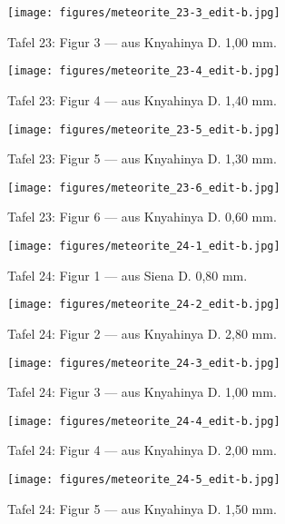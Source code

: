 \documentclass[a4paper, 11pt, oneside]{article}
\begin{document}
\clearpage
\begin{figure}[t]
\texttt{[image: figures/meteorite\_23-3\_edit-b.jpg]}
\caption{Tafel 23: Figur 3 --- aus Knyahinya D. 1,00 mm.}
\centering
\end{figure}
\clearpage
\begin{figure}[t]
\texttt{[image: figures/meteorite\_23-4\_edit-b.jpg]}
\caption{Tafel 23: Figur 4 --- aus Knyahinya D. 1,40 mm.}
\centering
\end{figure}
\clearpage
\begin{figure}[t]
\texttt{[image: figures/meteorite\_23-5\_edit-b.jpg]}
\caption{Tafel 23: Figur 5 --- aus Knyahinya D. 1,30 mm.}
\centering
\end{figure}
\clearpage
\begin{figure}[t]
\texttt{[image: figures/meteorite\_23-6\_edit-b.jpg]}
\caption{Tafel 23: Figur 6 --- aus Knyahinya D. 0,60 mm.}
\centering
\end{figure}
\clearpage
{}
\begin{figure}[t]
\texttt{[image: figures/meteorite\_24-1\_edit-b.jpg]}
\caption{Tafel 24: Figur 1 --- aus Siena D. 0,80 mm.}
\centering
\end{figure}
\clearpage
\begin{figure}[t]
\texttt{[image: figures/meteorite\_24-2\_edit-b.jpg]}
\caption{Tafel 24: Figur 2 --- aus Knyahinya D. 2,80 mm.}
\centering
\end{figure}
\clearpage
\begin{figure}[t]
\texttt{[image: figures/meteorite\_24-3\_edit-b.jpg]}
\caption{Tafel 24: Figur 3 --- aus Knyahinya D. 1,00 mm.}
\centering
\end{figure}
\clearpage
\begin{figure}[t]
\texttt{[image: figures/meteorite\_24-4\_edit-b.jpg]}
\caption{Tafel 24: Figur 4 --- aus Knyahinya D. 2,00 mm.}
\centering
\end{figure}
\clearpage
\begin{figure}[t]
\texttt{[image: figures/meteorite\_24-5\_edit-b.jpg]}
\caption{Tafel 24: Figur 5 --- aus Knyahinya D. 1,50 mm.}
\centering
\end{figure}
\end{document}
